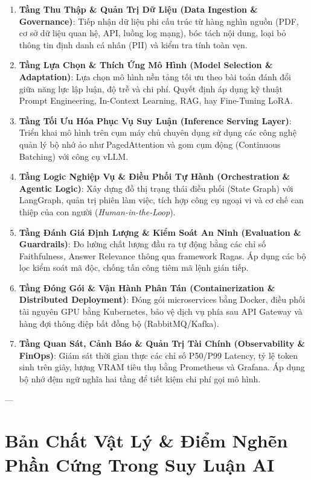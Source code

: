 \begin{enumerate}
  \item \textbf{Tầng Thu Thập \& Quản Trị Dữ Liệu (Data Ingestion \& Governance)}: Tiếp nhận dữ liệu phi cấu trúc từ hàng nghìn nguồn (PDF, cơ sở dữ liệu quan hệ, API, luồng log mạng), bóc tách nội dung, loại bỏ thông tin định danh cá nhân (PII) và kiểm tra tính toàn vẹn.
  \item \textbf{Tầng Lựa Chọn \& Thích Ứng Mô Hình (Model Selection \& Adaptation)}: Lựa chọn mô hình nền tảng tối ưu theo bài toán đánh đổi giữa năng lực lập luận, độ trễ và chi phí. Quyết định áp dụng kỹ thuật Prompt Engineering, In-Context Learning, RAG, hay Fine-Tuning LoRA.
  \item \textbf{Tầng Tối Ưu Hóa Phục Vụ Suy Luận (Inference Serving Layer)}: Triển khai mô hình trên cụm máy chủ chuyên dụng sử dụng các công nghệ quản lý bộ nhớ ảo như PagedAttention và gom cụm động (Continuous Batching) với công cụ vLLM.
  \item \textbf{Tầng Logic Nghiệp Vụ \& Điều Phối Tự Hành (Orchestration \& Agentic Logic)}: Xây dựng đồ thị trạng thái điều phối (State Graph) với LangGraph, quản trị phiên làm việc, tích hợp công cụ ngoại vi và cơ chế can thiệp của con người (\textit{Human-in-the-Loop}).
  \item \textbf{Tầng Đánh Giá Định Lượng \& Kiểm Soát An Ninh (Evaluation \& Guardrails)}: Đo lường chất lượng đầu ra tự động bằng các chỉ số Faithfulness, Answer Relevance thông qua framework Ragas. Áp dụng các bộ lọc kiểm soát mã độc, chống tấn công tiêm mã lệnh gián tiếp.
  \item \textbf{Tầng Đóng Gói \& Vận Hành Phân Tán (Containerization \& Distributed Deployment)}: Đóng gói microservices bằng Docker, điều phối tài nguyên GPU bằng Kubernetes, bảo vệ dịch vụ phía sau API Gateway và hàng đợi thông điệp bất đồng bộ (RabbitMQ/Kafka).
  \item \textbf{Tầng Quan Sát, Cảnh Báo \& Quản Trị Tài Chính (Observability \& FinOps)}: Giám sát thời gian thực các chỉ số P50/P99 Latency, tỷ lệ token sinh trên giây, lượng VRAM tiêu thụ bằng Prometheus và Grafana. Áp dụng bộ nhớ đệm ngữ nghĩa hai tầng để tiết kiệm chi phí gọi mô hình.
\end{enumerate}

---

\section{Bản Chất Vật Lý \& Điểm Nghẽn Phần Cứng Trong Suy Luận AI}
\label{sec:hardware-bottlenecks}

